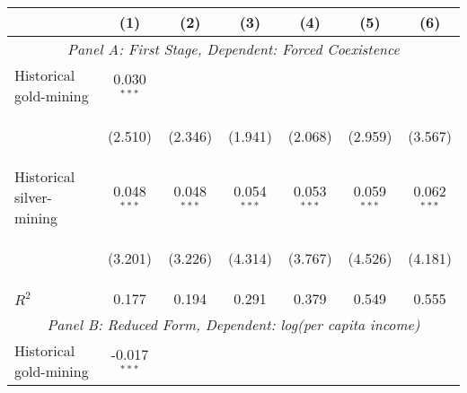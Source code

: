 \begin{center}
\begin{tabular}{lcccccc}
\hline \noalign{\smallskip} & (1) & (2) & (3) & (4) & (5) & (6)\\
\hline \multicolumn{7}{c}{\textit{Panel A: First Stage, Dependent: Forced Coexistence}}\\
\noalign{\smallskip}\noalign{\smallskip}Historical gold-mining & 0.030$ ^{***}$ \\
 & \begin{footnotesize}(2.510)\end{footnotesize} & \begin{footnotesize}(2.346)\end{footnotesize} & \begin{footnotesize}(1.941)\end{footnotesize} & \begin{footnotesize}(2.068)\end{footnotesize} & \begin{footnotesize}(2.959)\end{footnotesize} & \begin{footnotesize}(3.567)\end{footnotesize}\\
\noalign{\smallskip}Historical silver-mining & 0.048$ ^{***}$ & 0.048$ ^{***}$ & 0.054$ ^{***}$ & 0.053$ ^{***}$ & 0.059$ ^{***}$ & 0.062$ ^{***}$\\
 & \begin{footnotesize}(3.201)\end{footnotesize} & \begin{footnotesize}(3.226)\end{footnotesize} & \begin{footnotesize}(4.314)\end{footnotesize} & \begin{footnotesize}(3.767)\end{footnotesize} & \begin{footnotesize}(4.526)\end{footnotesize} & \begin{footnotesize}(4.181)\end{footnotesize}\\
\noalign{\smallskip}$ R^2$ & 0.177 & 0.194 & 0.291 & 0.379 & 0.549 & 0.555\\
\multicolumn{7}{c}{\textit{Panel B: Reduced Form, Dependent: log(per capita income)}} \\
\noalign{\smallskip}Historical gold-mining & -0.017$ ^{***}$ \\

\end{tabular}
\end{center}
